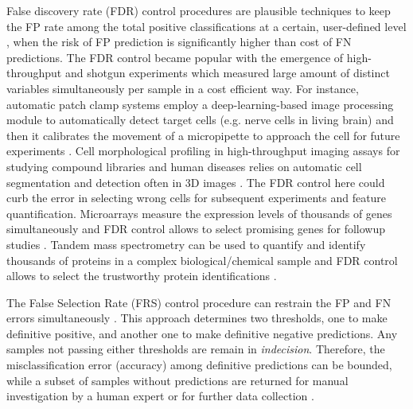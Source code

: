 \documentclass{article}
\begin{document}
False discovery rate (FDR) control procedures are plausible techniques to keep the FP rate among the total positive classifications at a certain, user-defined level \cite{Benjamini1995Controlling}, when the risk of FP prediction is significantly higher than cost of FN predictions. The FDR control became popular with the emergence of high-throughput and shotgun experiments which measured large amount of distinct variables simultaneously per sample in a cost efficient way. For instance, automatic patch clamp systems employ a deep-learning-based image processing module to automatically detect target cells (e.g. nerve cells in living brain) and then it calibrates the movement of a micropipette to approach the cell for future experiments \cite{koos2021automatic}. Cell morphological profiling in high-throughput imaging assays for studying compound libraries and human diseases \cite{moshkov2024learning} relies on automatic cell segmentation and detection often in 3D images \cite{falk2019u}. The FDR control here could curb the error in selecting wrong cells for subsequent experiments and feature quantification.  Microarrays measure the expression levels of thousands of genes simultaneously and FDR control allows to select promising genes for followup studies \cite{storey2002direct,storey2003statistical,barber2015controlling}. Tandem mass spectrometry can be used to quantify and identify thousands of proteins in a complex biological/chemical sample and FDR control allows to select the trustworthy protein identifications \cite{elias2007target}.

The False Selection Rate (FRS) control procedure can restrain the FP and FN errors simultaneously \cite{zhao2023controlling}. This approach determines two thresholds, one to make definitive positive, and another one to make definitive negative predictions. Any samples not passing either thresholds are remain in {\em indecision}. Therefore, the misclassification error (accuracy) among definitive predictions can be bounded, while a subset of samples without predictions are returned for manual investigation by a human expert or for further data collection \cite{rava2021burden}. 
\end{document}
